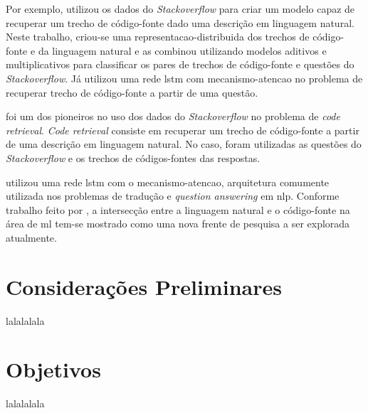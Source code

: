 Por exemplo, \cite{Allamanis-bimodal-source-code-natural-language:2015} utilizou os dados do \textit{Stackoverflow} para criar um \gls{modelo} capaz de recuperar um trecho de código-fonte dado uma descrição em linguagem natural. Neste trabalho, criou-se uma \gls{representacao-distribuida} dos trechos de código-fonte e da linguagem natural e as combinou utilizando modelos aditivos e multiplicativos para classificar os pares de trechos de código-fonte e questões do \textit{Stackoverflow}. Já \cite{iyer-etal-2016-summarizing} utilizou uma rede \acrfull{lstm} com \gls{mecanismo-atencao} no problema de recuperar trecho de código-fonte a partir de uma questão.

\cite{Allamanis-bimodal-source-code-natural-language:2015} foi um dos pioneiros no uso dos dados do \textit{Stackoverflow} no problema de \textit{code retrieval}. \textit{Code retrieval} consiste em recuperar um trecho de código-fonte a partir de uma descrição em linguagem natural. No caso, foram utilizadas as questões do \textit{Stackoverflow} e os trechos de códigos-fontes das respostas. 

\cite{iyer-etal-2016-summarizing} utilizou uma rede \acrshort{lstm} com o \gls{mecanismo-atencao}, arquitetura comumente utilizada nos problemas de tradução e \textit{question answering} em \acrfull{nlp}. Conforme trabalho feito por \cite{Allamanis:2018:SML}, a intersecção entre a linguagem natural e o código-fonte na área de \gls{ml} tem-se mostrado como uma nova frente de pesquisa a ser explorada atualmente. 










\section{Considerações Preliminares}
\label{sec:consideracoes_preliminares}

lalalalala


\section{Objetivos}
\label{sec:objetivo}

lalalalala

